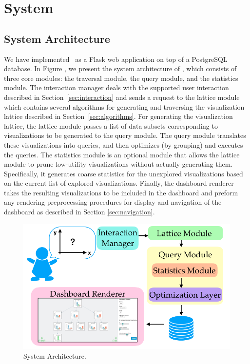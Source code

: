 \section{System\label{sec:system}}
\subsection{System Architecture}
We have implemented \system\ as a Flask web application on top of a PostgreSQL database. In Figure \label{system_architecture}, we present the system architecture of \system, which consists of three core modules: the traversal module, the query module, and the statistics module. The interaction manager deals with the supported user interaction described in Section~\ref{sec:interaction} and sends a request to the lattice module which  contains several algorithms for generating and traversing the visualization lattice described in Section~\ref{sec:algorithms}. For generating the visualization lattice, the lattice module passes a list of data subsets corresponding to visualizations to be generated to the query module. The query module translates these visualizations into queries, and then optimizes (by grouping) and executes the queries. The statistics module is an optional module that allows the lattice module to prune low-utility visualizations without actually generating them. Specifically, it generates coarse statistics for the unexplored visualizations based on the current list of explored visualizations. Finally, the dashboard renderer takes the resulting visualizations to be included in the dashboard and preform any rendering preprocessing procedures for display and navigation of the dashboard as described in Section \ref{sec:navigation}.
\begin{figure}[ht!]
\centering
\includegraphics[width=\linewidth]{figures/system_architecture.png}
\caption{System Architecture.}%
\label{system_architecture}
\end{figure}

